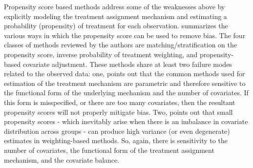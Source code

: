 \documentclass[../main.tex]{subfiles}
\begin{document}
\vspace{\baselineskip}
Propensity score based methods address some of the weaknesses above by explicitly modeling the treatment assignment mechanism and estimating a probability (propensity) of treatment for each observation. \textcite{Austin2011AnStudies} summarizes the various ways in which the propensity score can be used to remove bias. The four classes of methods reviewed by the authors are matching/stratification on the propensity score, inverse probability of treatment weighting, and propensity-based covariate adjustment. These methods share at least two failure modes related to the observed data: one, \textcite{Hill2011BayesianInference} points out that the common methods used for estimation of the treatment mechanism are parametric and therefore sensitive to the functional form of the underlying mechanism and the number of covariates. If this form is misspecified, or there are too many covariates, then the resultant propensity scores will not properly mitigate bias. Two, \textcite{Knaus2018MachineEvidence} points out that small propensity scores - which inevitably arise when there is an imbalance in covariate distribution across groups - can produce high variance (or even degenerate) estimates in weighting-based methods. So, again, there is sensitivity to the number of covariates, the functional form of the treatment assignment mechanism, and the covariate balance.\par
\end{document}
